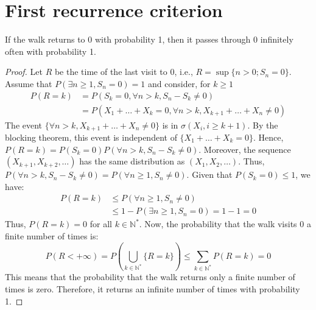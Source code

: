 \section{First recurrence criterion}%
\begin{proposition}If the walk returns to 0 with probability 1, then it passes through 0 infinitely often with probability 1.\end{proposition}%
\begin{proof}
Let $R$ be the time of the last visit to 0, i.e., $R = \sup\{n > 0; S_n = 0\}$.
Assume that $P(\exists n \ge 1, S_n=0) = 1$ and consider, for $k \ge 1$
\begin{align*}
    P(R=k) &= P(S_k=0, \forall n>k, S_n-S_k \neq 0) \\
    &= P(X_1+\dots+X_k = 0, \forall n>k, X_{k+1}+\dots+X_n \neq 0)
\end{align*}
The event $\{\forall n>k, X_{k+1}+\dots+X_n \neq 0\}$ is in $\sigma(X_i, i \ge k+1)$.
By the blocking theorem, this event is independent of $\{X_1+\dots+X_k=0\}$.
Hence, $P(R=k) = P(S_k=0) P(\forall n>k, S_n-S_k \neq 0)$.
Moreover, the sequence $(X_{k+1}, X_{k+2}, \dots)$ has the same distribution as $(X_1, X_2, \dots)$.
Thus, $P(\forall n>k, S_n-S_k \neq 0) = P(\forall n \ge 1, S_n \neq 0)$.
Given that $P(S_k=0) \le 1$, we have:
\begin{align*}
    P(R=k) &\le P(\forall n \ge 1, S_n \neq 0) \\
    &\le 1 - P(\exists n \ge 1, S_n = 0) = 1-1=0
\end{align*}
Thus, $P(R=k)=0$ for all $k \in \mathbb{N}^*$.
Now, the probability that the walk visits 0 a finite number of times is:
\begin{equation*}
    P(R < +\infty) = P(\bigcup_{k \in \mathbb{N}^*} \{R=k\}) \le \sum_{k \in \mathbb{N}^*} P(R=k) = 0
\end{equation*}
This means that the probability that the walk returns only a finite number of times is zero. Therefore, it returns an infinite number of times with probability 1.
\end{proof}%
